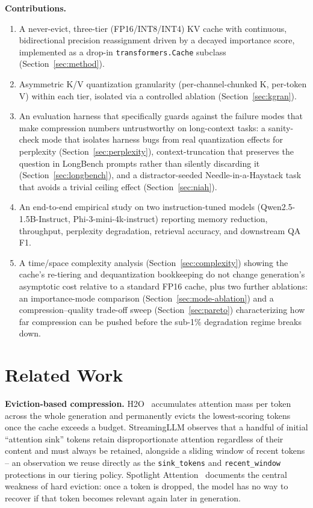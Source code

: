 \documentclass[conference]{IEEEtran}
\begin{document}
\textbf{Contributions.}
\begin{enumerate}
  \item A never-evict, three-tier (FP16/INT8/INT4) KV cache with continuous,
  bidirectional precision reassignment driven by a decayed importance score, implemented
  as a drop-in \texttt{transformers.Cache} subclass (Section~\ref{sec:method}).
  \item Asymmetric K/V quantization granularity (per-channel-chunked K, per-token V)
  within each tier, isolated via a controlled ablation (Section~\ref{sec:kgran}).
  \item An evaluation harness that specifically guards against the failure modes that
  make compression numbers untrustworthy on long-context tasks: a sanity-check mode that
  isolates harness bugs from real quantization effects for perplexity
  (Section~\ref{sec:perplexity}), context-truncation that preserves the question in
  LongBench prompts rather than silently discarding it (Section~\ref{sec:longbench}), and
  a distractor-seeded Needle-in-a-Haystack task that avoids a trivial ceiling effect
  (Section~\ref{sec:niah}).
  \item An end-to-end empirical study on two instruction-tuned models
  (Qwen2.5-1.5B-Instruct, Phi-3-mini-4k-instruct) reporting memory reduction,
  throughput, perplexity degradation, retrieval accuracy, and downstream QA F1.
  \item A time/space complexity analysis (Section~\ref{sec:complexity}) showing the
  cache's re-tiering and dequantization bookkeeping do not change generation's
  asymptotic cost relative to a standard FP16 cache, plus two further ablations: an
  importance-mode comparison (Section~\ref{sec:mode-ablation}) and a
  compression--quality trade-off sweep (Section~\ref{sec:pareto}) characterizing how
  far compression can be pushed before the sub-1\% degradation regime breaks down.
\end{enumerate}

\section{Related Work}

\textbf{Eviction-based compression.} H2O~\cite{h2o} accumulates attention mass per token
across the whole generation and permanently evicts the lowest-scoring tokens once the
cache exceeds a budget. StreamingLLM observes that a handful of initial ``attention
sink'' tokens retain disproportionate attention regardless of their content and must
always be retained, alongside a sliding window of recent tokens -- an observation we
reuse directly as the \texttt{sink\_tokens} and \texttt{recent\_window} protections in
our tiering policy. Spotlight Attention~\cite{spotlight} documents the central weakness
of hard eviction: once a token is dropped, the model has no way to recover if that token
becomes relevant again later in generation.
\end{document}
